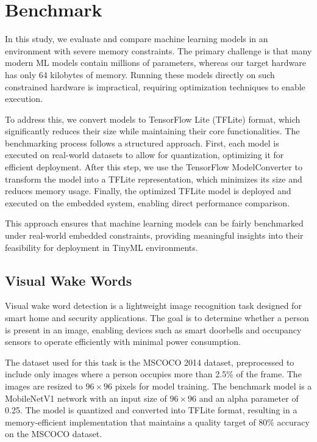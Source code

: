\documentclass[conference]{IEEEtran}
\begin{document}
\section{Benchmark}

In this study, we evaluate and compare machine learning models in an environment with severe memory constraints. The primary challenge is that many modern ML models contain millions of parameters, whereas our target hardware has only 64 kilobytes of memory. Running these models directly on such constrained hardware is impractical, requiring optimization techniques to enable execution.

To address this, we convert models to TensorFlow Lite (TFLite) format, which significantly reduces their size while maintaining their core functionalities. The benchmarking process follows a structured approach. First, each model is executed on real-world datasets to allow for quantization, optimizing it for efficient deployment. After this step, we use the TensorFlow ModelConverter to transform the model into a TFLite representation, which minimizes its size and reduces memory usage. Finally, the optimized TFLite model is deployed and executed on the embedded system, enabling direct performance comparison.

This approach ensures that machine learning models can be fairly benchmarked under real-world embedded constraints, providing meaningful insights into their feasibility for deployment in TinyML environments.



\subsection{Visual Wake Words}

Visual wake word detection is a lightweight image recognition task designed for smart home and security applications. The goal is to determine whether a person is present in an image, enabling devices such as smart doorbells and occupancy sensors to operate efficiently with minimal power consumption.

The dataset used for this task is the MSCOCO 2014 dataset, preprocessed to include only images where a person occupies more than 2.5\% of the frame. The images are resized to $96\times96$ pixels for model training. The benchmark model is a MobileNetV1 network with an input size of $96\times96$ and an alpha parameter of 0.25. The model is quantized and converted into TFLite format, resulting in a memory-efficient implementation that maintains a quality target of 80\% accuracy on the MSCOCO dataset.
\end{document}

